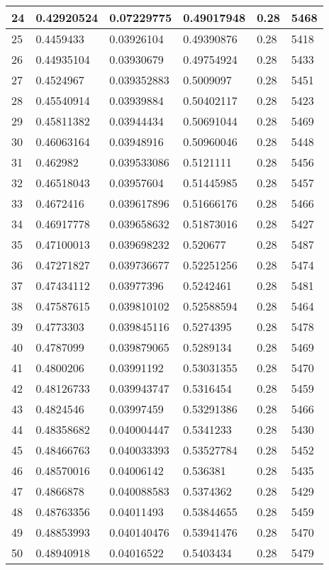 \begin{longtable}{|l|l|l|l|l|l|}
24 & 0.42920524 & 0.07229775 & 0.49017948 & 0.28 & 5468 \\ \hline 
25 & 0.4459433 & 0.03926104 & 0.49390876 & 0.28 & 5418 \\ \hline 
26 & 0.44935104 & 0.03930679 & 0.49754924 & 0.28 & 5433 \\ \hline 
27 & 0.4524967 & 0.039352883 & 0.5009097 & 0.28 & 5451 \\ \hline 
28 & 0.45540914 & 0.03939884 & 0.50402117 & 0.28 & 5423 \\ \hline 
29 & 0.45811382 & 0.03944434 & 0.50691044 & 0.28 & 5469 \\ \hline 
30 & 0.46063164 & 0.03948916 & 0.50960046 & 0.28 & 5448 \\ \hline 
31 & 0.462982 & 0.039533086 & 0.5121111 & 0.28 & 5456 \\ \hline 
32 & 0.46518043 & 0.03957604 & 0.51445985 & 0.28 & 5457 \\ \hline 
33 & 0.4672416 & 0.039617896 & 0.51666176 & 0.28 & 5466 \\ \hline 
34 & 0.46917778 & 0.039658632 & 0.51873016 & 0.28 & 5427 \\ \hline 
35 & 0.47100013 & 0.039698232 & 0.520677 & 0.28 & 5487 \\ \hline 
36 & 0.47271827 & 0.039736677 & 0.52251256 & 0.28 & 5474 \\ \hline 
37 & 0.47434112 & 0.03977396 & 0.5242461 & 0.28 & 5481 \\ \hline 
38 & 0.47587615 & 0.039810102 & 0.52588594 & 0.28 & 5464 \\ \hline 
39 & 0.4773303 & 0.039845116 & 0.5274395 & 0.28 & 5478 \\ \hline 
40 & 0.4787099 & 0.039879065 & 0.5289134 & 0.28 & 5469 \\ \hline 
41 & 0.4800206 & 0.03991192 & 0.53031355 & 0.28 & 5470 \\ \hline 
42 & 0.48126733 & 0.039943747 & 0.5316454 & 0.28 & 5459 \\ \hline 
43 & 0.4824546 & 0.03997459 & 0.53291386 & 0.28 & 5466 \\ \hline 
44 & 0.48358682 & 0.040004447 & 0.5341233 & 0.28 & 5430 \\ \hline 
45 & 0.48466763 & 0.040033393 & 0.53527784 & 0.28 & 5452 \\ \hline 
46 & 0.48570016 & 0.04006142 & 0.536381 & 0.28 & 5435 \\ \hline 
47 & 0.4866878 & 0.040088583 & 0.5374362 & 0.28 & 5429 \\ \hline 
48 & 0.48763356 & 0.04011493 & 0.53844655 & 0.28 & 5459 \\ \hline 
49 & 0.48853993 & 0.040140476 & 0.53941476 & 0.28 & 5470 \\ \hline 
50 & 0.48940918 & 0.04016522 & 0.5403434 & 0.28 & 5479 \\ \hline 
\end{longtable}